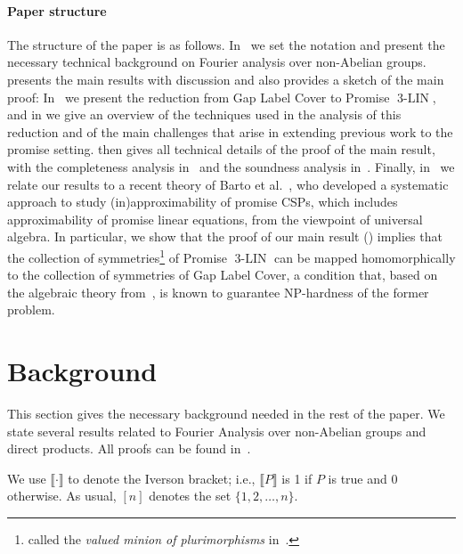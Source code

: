 \documentclass[a4paper,11pt]{article}
\theoremstyle{definition}
\newcommand{\eq}{\ensuremath{\operatorname{3-LIN}}}
\begin{document}
\paragraph{Paper structure}
%
The structure of the paper is as follows. 
%
In~ we set the notation and present the necessary technical background on Fourier analysis over non-Abelian groups.
%
 presents the main results with discussion and also provides a sketch of the main proof: In~ we present the reduction from Gap Label
Cover to Promise $\eq$,
and in
 we give an overview of the techniques used in the analysis of
this reduction and of the main challenges that arise in extending previous work
to the promise setting. 
%
 then gives all technical details of the proof of the main result, with the completeness analysis in~ and the soundness analysis in~.
%
Finally, in~ we relate our results to a recent
theory of Barto et al.~\cite{Barto24:lics}, who developed a systematic approach
to study (in)approximability of promise CSPs, which includes approximability of
promise linear equations, from the viewpoint of universal algebra. In
particular, we show that the proof of our main result () implies that the collection
of symmetries\footnote{called the \emph{valued minion of plurimorphisms}
in~\cite{Barto24:lics}.} of 
Promise $\eq$ 
can be mapped
homomorphically to the collection of symmetries of Gap Label Cover, a condition
that, based on the algebraic theory from~\cite{Barto24:lics}, is known to guarantee NP-hardness of the former problem.


\section{Background}\label{sec:background}

This section gives the necessary background needed in the rest of the paper. We state several results related to Fourier Analysis over non-Abelian groups
and direct products. All proofs can be found in~. \par

We use $\llbracket \cdot \rrbracket$ to denote the Iverson bracket; i.e.,
$\llbracket P\rrbracket$ is 1 if $P$ is true and $0$ otherwise.
As usual, $[n]$ denotes the set $\{1,2,\ldots,n\}$. \par
\end{document}
